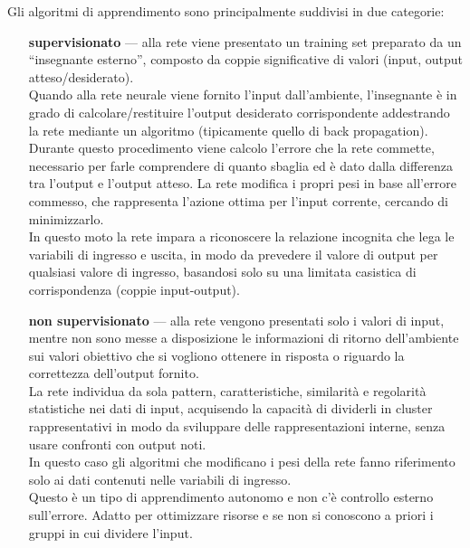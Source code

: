 Gli algoritmi di apprendimento sono principalmente suddivisi in due categorie:
\begin{itemize}
	\item[\bfseries supervisionato] --- alla rete viene presentato un training set preparato da un ``insegnante esterno'', composto da coppie significative di valori (input, output atteso/desiderato).\\
	Quando alla rete neurale viene fornito l'input dall'ambiente, l'insegnante è in grado di calcolare/restituire l'output desiderato corrispondente addestrando la rete mediante un algoritmo (tipicamente quello di back propagation). 
	Durante questo procedimento viene calcolo l'errore che la rete commette, necessario per farle comprendere di quanto sbaglia ed è dato dalla differenza tra l'output e l'output atteso. La rete modifica i propri pesi in base all'errore commesso, che rappresenta l'azione ottima per l'input corrente, cercando di minimizzarlo.\\
	In questo moto la rete impara a riconoscere la relazione incognita che lega le variabili di ingresso e uscita, in modo da prevedere il valore di output per qualsiasi valore di ingresso, basandosi solo su una limitata casistica di corrispondenza (coppie input-output).
	
	\item[\bfseries non supervisionato] --- alla rete vengono presentati solo i valori di input, mentre non sono messe a disposizione le informazioni di ritorno dell'ambiente sui valori obiettivo che si vogliono ottenere in risposta o riguardo la correttezza dell'output fornito. \\
	La rete individua da sola pattern, caratteristiche, similarità e regolarità statistiche nei dati di input, acquisendo la capacità di dividerli in cluster rappresentativi in modo da sviluppare delle rappresentazioni interne, senza usare confronti con output noti.\\ 
	In questo caso gli algoritmi che modificano i pesi della rete fanno riferimento solo ai dati contenuti nelle variabili di ingresso.\\
	Questo è un tipo di apprendimento autonomo e non c'è controllo esterno sull'errore. Adatto per ottimizzare risorse e se non si conoscono a priori i gruppi in cui dividere l'input.
\end{itemize}


